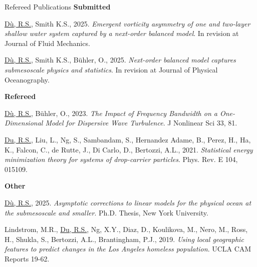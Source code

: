 \documentclass{resume} %
\begin{document}
\begin{rSection}{Refereed Publications}
{\bf Submitted}
\renewcommand{\theenumi}{S.\arabic{enumi}}
\begin{etaremune}
    \setcounter{enumi}{5}
    \item \underline{D\`u, R.S.}, Smith K.S., 2025. \textit{Emergent vorticity asymmetry of one and two-layer shallow water system captured by a next-order balanced model}. In revision at Journal of Fluid Mechanics.
    \item \underline{D\`u, R.S.}, Smith K.S., Bühler, O., 2025. \textit{Next-order balanced model captures submesoscale physics and statistics}. In revision at Journal of Physical Oceanography.
\end{etaremune}
{\bf Refereed}
\renewcommand{\theenumi}{R.\arabic{enumi}}
\begin{etaremune}
    \item \underline{D\`u, R.S.}, B\"uhler, O., 2023. \textit{The Impact of Frequency Bandwidth on a One-Dimensional Model for Dispersive Wave Turbulence}. J Nonlinear Sci 33, 81.
    \item \underline{Du, R.S.}, Liu, L., Ng, S., Sambandam, S., Hernandez Adame, B., Perez, H., Ha, K., Falcon, C., de Rutte, J., Di Carlo, D., Bertozzi, A.L., 2021. \textit{Statistical energy minimization theory for systems of drop-carrier particles}. Phys. Rev. E 104, 015109.
\end{etaremune}
{\bf Other}
\renewcommand{\theenumi}{O.\arabic{enumi}}
\begin{etaremune}
    \item \underline{D\`u, R.S.}, 2025. \textit{Asymptotic corrections to linear models for the physical ocean at the submesoscale and smaller}. Ph.D. Thesis, New York University.
    \item Lindstrom, M.R., \underline{Du, R.S.}, Ng, X.Y., Diaz, D., Koulikova, M., Nero, M., Ross, H., Shukla, S., Bertozzi, A.L., Brantingham, P.J., 2019. \textit{Using local geographic features to predict changes in the Los Angeles homeless population}. UCLA CAM Reports 19-62.
\end{etaremune}
\end{rSection}

\end{document}
